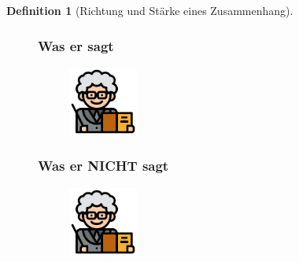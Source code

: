 \documentclass[
  a4paper,
  DIV=11]{scrreprt}
\theoremstyle{definition}
\theoremstyle{definition}
\theoremstyle{definition}
\newtheorem{definition}{Definition}[chapter]
\theoremstyle{remark}
\begin{document}
\begin{definition}[Richtung und Stärke eines
Zusammenhang]
\begin{figure}

\begin{minipage}{0.45\linewidth}

\subsubsection{Was er sagt}\label{was-er-sagt}

\begin{figure}[H]

{\centering \includegraphics[width=0.25\textwidth,height=\textheight]{img/teacher.png}

}


\end{figure}%

\end{minipage}%
%
\begin{minipage}{0.10\linewidth}

\end{minipage}%
%
\begin{minipage}{0.45\linewidth}

\subsubsection{Was er NICHT sagt}\label{was-er-nicht-sagt}

\begin{figure}[H]

{\centering \includegraphics[width=0.25\textwidth,height=\textheight]{img/teacher.png}

}



\end{figure}
\end{minipage}
\end{figure}
\end{definition}
\end{document}
